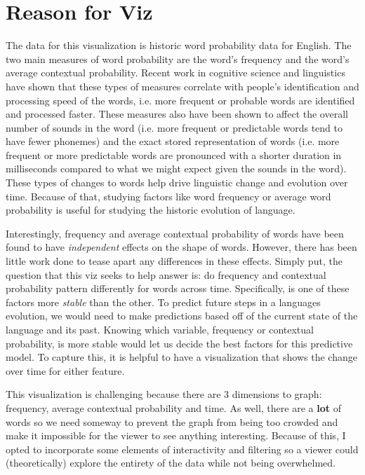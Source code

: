 \documentclass[11pt]{article}
\author{Adam King}
\begin{document}
\maketitle

\section{Reason for Viz}


The data for this visualization is historic word probability data for English. The two main measures of word probability are the word's frequency and the word's average contextual probability. Recent work in cognitive science and linguistics have shown that these types of measures correlate with people's identification and processing speed of the words, i.e. more frequent or probable words are identified and processed faster. These measures also have been shown to affect the overall number of sounds in the word (i.e. more frequent or predictable words tend to have fewer phonemes) and the exact stored representation of words (i.e. more frequent or more predictable words are pronounced with a shorter duration in milliseconds compared to what we might expect given the sounds in the word). These types of changes to words help drive linguistic change and evolution over time. Because of that, studying factors like word frequency or average word probability is useful for studying the historic evolution of language.

Interestingly, frequency and average contextual probability of words have been found to have {\it independent} effects on the shape of words. However, there has been little work done to tease apart any differences in these effects. Simply put, the question that this viz seeks to help answer is: do frequency and contextual probability pattern differently for words across time. Specifically, is one of these factors more {\it stable} than the other. To predict future steps in a languages evolution, we would need to make predictions based off of the current state of the language and its past. Knowing which variable, frequency or contextual probability, is more stable would let us decide the best factors for this predictive model. To capture this, it is helpful to have a visualization that shows the change over time for either feature. 

This visualization is challenging because there are 3 dimensions to graph: frequency, average contextual probability and time. As well, there are a {\bf lot} of words so we need someway to prevent the graph from being too crowded and make it impossible for the viewer to see anything interesting. Because of this, I opted to incorporate some elements of interactivity and filtering so a viewer could (theoretically) explore the entirety of the data while not being overwhelmed.
\end{document}
